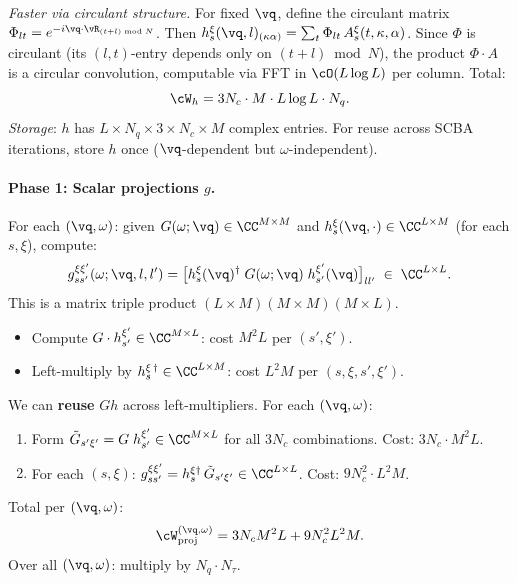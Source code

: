 \emph{Faster via circulant structure.}
For fixed $\vq$, define the circulant matrix
$\Phi_{lt} = e^{-i\vq\cdot\vR_{(t+l)\bmod N}}$.  Then
$h_s^{\xi}(\vq, l)_{(\kappa\alpha)}
= \sum_t \Phi_{lt}\, A_s^\xi(t, \kappa, \alpha)$.
Since $\Phi$ is circulant (its $(l,t)$-entry depends only on
$(t + l) \bmod N$), the product $\Phi \cdot A$ is a circular
convolution, computable via FFT in $\cO(L \log L)$ per column.
Total:
\begin{equation}\label{eq:cost_h}
  \cW_h = 3 N_c \cdot M \cdot L\log L \cdot N_q.
\end{equation}
\emph{Storage}: $h$ has $L \times N_q \times 3 \times N_c \times M$
complex entries.  For reuse across SCBA iterations, store
$h$ once ($\vq$-dependent but $\omega$-independent).

\paragraph{Phase 1: Scalar projections $g$.}

For each $(\vq, \omega)$: given $G(\omega;\vq) \in \CC^{M \times M}$
and $h_s^\xi(\vq, \cdot) \in \CC^{L \times M}$ (for each $s, \xi$),
compute:
\begin{equation}\label{eq:proj_matmul}
  g_{ss'}^{\xi\xi'}(\omega;\vq,l,l')
  = \bigl[h_s^{\xi}(\vq)^\dagger\; G(\omega;\vq)\;
    h_{s'}^{\xi'}(\vq)\bigr]_{ll'}
  \;\in\; \CC^{L \times L}.
\end{equation}
This is a matrix triple product $(L \times M)(M \times M)(M \times L)$.
\begin{itemize}
  \item Compute $G \cdot h_{s'}^{\xi'} \in \CC^{M \times L}$:
    cost $M^2 L$ per $(s', \xi')$.
  \item Left-multiply by $h_s^{\xi\,\dagger} \in \CC^{L \times M}$:
    cost $L^2 M$ per $(s, \xi, s', \xi')$.
\end{itemize}

We can \textbf{reuse} $G h$ across left-multipliers.  For each
$(\vq, \omega)$:
\begin{enumerate}
  \item Form $\tilde{G}_{s'\xi'} = G\; h_{s'}^{\xi'}
    \in \CC^{M \times L}$ for all $3 N_c$ combinations.
    Cost: $3 N_c \cdot M^2 L$.
  \item For each $(s, \xi)$: $g_{ss'}^{\xi\xi'} =
    h_s^{\xi\dagger}\, \tilde{G}_{s'\xi'} \in \CC^{L\times L}$.
    Cost: $9 N_c^2 \cdot L^2 M$.
\end{enumerate}
Total per $(\vq, \omega)$:
\begin{equation}\label{eq:cost_proj}
  \cW_\mathrm{proj}^{(\vq,\omega)}
  = 3 N_c M^2 L + 9 N_c^2 L^2 M.
\end{equation}
Over all $(\vq, \omega)$: multiply by $N_q \cdot N_\tau$.

